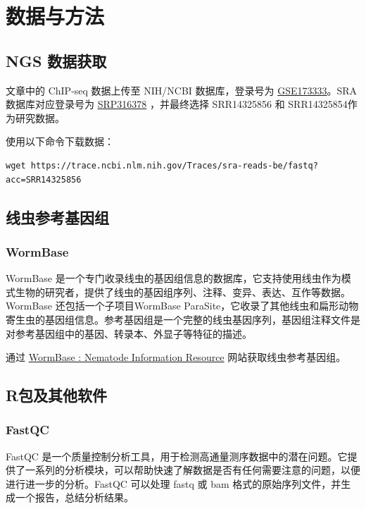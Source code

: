 \documentclass[UTF8]{ctexart}
\begin{document}
\section{数据与方法}

\subsection{NGS 数据获取}

文章中的 ChIP-seq 数据上传至 NIH/NCBI 数据库，登录号为 \href{https://www.ncbi.nlm.nih.gov/geo/query/acc.cgi?acc=GSE173333}{GSE173333}。SRA 数据库对应登录号为 \href{https://www.ncbi.nlm.nih.gov/sra?term=SRP316378}{SRP316378} ，并最终选择 SRR14325856 和 SRR14325854作为研究数据。

使用以下命令下载数据：

\begin{lstlisting}
wget https://trace.ncbi.nlm.nih.gov/Traces/sra-reads-be/fastq?acc=SRR14325856
\end{lstlisting}

\subsection{线虫参考基因组}

\subsubsection{WormBase}

WormBase 是一个专门收录线虫的基因组信息的数据库，它支持使用线虫作为模式生物的研究者，提供了线虫的基因组序列、注释、变异、表达、互作等数据。WormBase 还包括一个子项目WormBase ParaSite，它收录了其他线虫和扁形动物寄生虫的基因组信息。参考基因组是一个完整的线虫基因序列，基因组注释文件是对参考基因组中的基因、转录本、外显子等特征的描述。

通过 \href{https://wormbase.org/}{WormBase : Nematode Information Resource} 网站获取线虫参考基因组。

\subsection{R包及其他软件}

\subsubsection{FastQC}

FastQC 是一个质量控制分析工具，用于检测高通量测序数据中的潜在问题。它提供了一系列的分析模块，可以帮助快速了解数据是否有任何需要注意的问题，以便进行进一步的分析。FastQC 可以处理 fastq 或 bam 格式的原始序列文件，并生成一个报告，总结分析结果。
\end{document}

